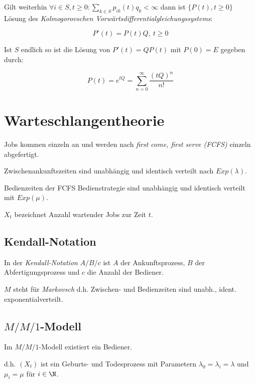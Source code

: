 \spacing

Gilt weiterhin $\forall i \in S, t \geq 0 : \sum_{k \in S} p_{ik}(t)q_k < \infty$ dann ist $\{P(t),t\geq 0\}$ Lösung des \emph{Kolmogorovschen Vorwärtsdifferentialgleichungssystems}:

\vspace*{-2mm}
\[ P'(t)=P(t)Q, \ t \geq 0 \]

\spacing

Ist $S$ endlich so ist die Lösung von $P'(t) = QP(t)$ mit $P(0)=E$ gegeben durch:

\vspace*{-2mm}
\[ P(t) = e^{tQ} = \sum_{n=0}^\infty \frac{(tQ)^n}{n!} \]

\section*{Warteschlangentheorie}

Jobs kommen einzeln an und werden nach \emph{first come, first serve (FCFS)} einzeln abgefertigt.

Zwischenankunftszeiten sind unabhängig und identisch verteilt nach $Exp(\lambda)$.

Bedienzeiten der FCFS Bedienstrategie sind unabhängig und identisch verteilt mit $Exp(\mu)$.

$X_t$ bezeichnet Anzahl wartender Jobs zur Zeit $t$.

\subsection*{Kendall-Notation}

In der \emph{Kendall-Notation} $A/B/c$ ist $A$ der Ankunftsprozess, $B$ der Abfertigungsprozess und $c$ die Anzahl der Bediener.

\vspace*{1mm}

$M$ steht für \emph{Markovsch} d.h. Zwischen- und Bedienzeiten sind unabh., ident. exponentialverteilt.

\subsection*{$M/M/1$-Modell}

Im $M/M/1$-Modell existiert ein Bediener.

d.h. $(X_t)$ ist ein Geburts- und Todesprozess mit Parametern $\lambda_0 = \lambda_i = \lambda$ und $\mu_i = \mu$ für $i \in \N$.

\vspace*{1mm}

